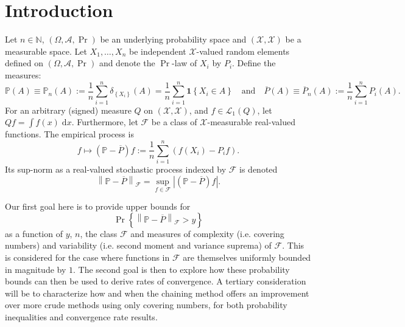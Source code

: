 
\section{Introduction}

Let \(n \in \mathbb{N}\), \((\Omega, \mathscr{A}, \Pr)\) be an underlying
probability space and \((\mathcal{X}, \mathscr{X})\) be a measurable space.
Let \(X_{1}, \dots, X_{n}\) be independent \(\mathcal{X}\)-valued random
elements defined on \((\Omega, \mathscr{A}, \Pr)\) and denote the \(\Pr\)-law of
\(X_{i}\) by \(P_{i}\).
Define the measures:
\begin{equation*}
  \mathbb{P} (A) \equiv \mathbb{P}_{n} (A) := \frac{1}{n} \sum_{i = 1}^{n}
  \delta_{\left\{ X_{i} \right\}} (A) = \frac{1}{n} \sum_{i = 1}^{n} \mathbf{1}
  \left\{ X_{i} \in A \right\} \quad \text{and} \quad \overline{P} (A) \equiv
  \overline{P}_{n} (A) := \frac{1}{n} \sum_{i = 1}^{n} P_{i} (A).
\end{equation*}
For an arbitrary (signed) measure \(Q\) on \((\mathcal{X}, \mathscr{X})\), and
\(f \in \mathscr{L}_{1} (Q)\), let \(Q f = \int f (x) \; \mathrm{d} x\).
Furthermore, let \(\mathcal{F}\) be a class of \(\mathscr{X}\)-measurable
real-valued functions.
The empirical process is
\begin{equation*}
  f \mapsto \left( \mathbb{P} - \overline{P} \right) f := \frac{1}{n}
  \sum_{i = 1}^{n} \left( f \left( X_{i} \right) - P_{i} f \right).
\end{equation*}
Its sup-norm as a real-valued stochastic process indexed by \(\mathcal{F}\)
is denoted
\begin{equation*}
  \left\| \mathbb{P} - \overline{P} \right\|_{\mathcal{F}} = \sup_{f \in
  \mathcal{F}} \left| \left( \mathbb{P} - \overline{P} \right) f \right|.
\end{equation*}

Our first goal here is to provide upper bounds for
\begin{equation*}
  \Pr \left\{ \left\| \mathbb{P} - \overline{P} \right\|_{\mathcal{F}} > y
  \right\}
\end{equation*}
as a function of \(y\), \(n\), the class \(\mathcal{F}\) and measures of
complexity (i.e. covering numbers) and variability (i.e. second moment and
variance suprema) of \(\mathcal{F}\).
This is considered for the case where functions in \(\mathcal{F}\) are
themselves uniformly bounded in magnitude by \(1\).
The second goal is then to explore how these probability bounds can then be used
to derive rates of convergence.
A tertiary consideration will be to characterize how and when the chaining
method offers an improvement over more crude methods using only covering
numbers, for both probability inequalities and convergence rate results.


